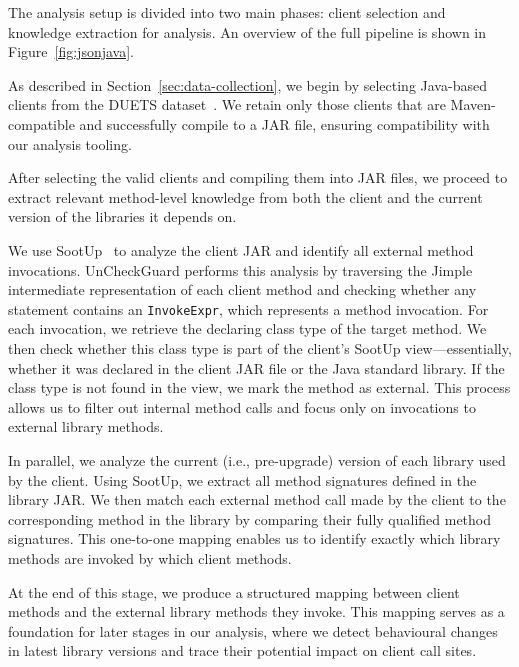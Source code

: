 The analysis setup is divided into two main phases: client selection and knowledge extraction for analysis. An overview of the full pipeline is shown in Figure~\ref{fig:jsonjava}.

As described in Section~\ref{sec:data-collection}, we begin by selecting Java-based clients from the DUETS dataset~\cite{durieux21:_duets}. We retain only those clients that are Maven-compatible and successfully compile to a JAR file, ensuring compatibility with our analysis tooling.

After selecting the valid clients and compiling them into JAR files, we proceed to extract relevant method-level knowledge from both the client and the current version of the libraries it depends on.

We use SootUp~\cite{Karakaya24:_sootup} to analyze the client JAR and identify all external method invocations. UnCheckGuard performs this analysis by traversing the Jimple intermediate representation of each client method and checking whether any statement contains an \texttt{InvokeExpr}, which represents a method invocation. For each invocation, we retrieve the declaring class type of the target method. We then check whether this class type is part of the client’s SootUp view---essentially, whether it was declared in the client JAR file or the Java standard library. If the class type is not found in the view, we mark the method as external. This process allows us to filter out internal method calls and focus only on invocations to external library methods.

In parallel, we analyze the current (i.e., pre-upgrade) version of each library used by the client. Using SootUp, we extract all method signatures defined in the library JAR. We then match each external method call made by the client to the corresponding method in the library by comparing their fully qualified method signatures. This one-to-one mapping enables us to identify exactly which library methods are invoked by which client methods.

At the end of this stage, we produce a structured mapping between client methods and the external library methods they invoke. This mapping serves as a foundation for later stages in our analysis, where we detect behavioural changes in latest library versions and trace their potential impact on client call sites.


